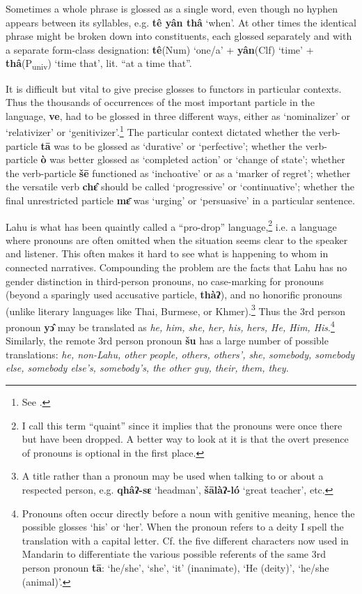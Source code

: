 Sometimes a whole phrase is glossed as a single word, even though no
hyphen appears between its syllables, e.g. \textbf{tê yân thâ} `when'.
At other times the identical phrase might be broken down into
constituents, each glossed separately and with a separate form-class
designation: \textbf{tê}(Num) `one/a' + \textbf{yân}(Clf) `time' +
\textbf{thâ}(P\textsubscript{univ}) `time that', lit. ``at a time that''.

It is difficult but vital to give precise glosses to functors in
particular contexts. Thus the thousands of occurrences of the most
important particle in the language, \textbf{ve}, had to be glossed in
three different ways, either as `nominalizer' or `relativizer' or
`genitivizer'.\footnote{See \citet{matisoff1972}.} The particular context
dictated whether the verb-particle \textbf{tā} was to be glossed as
`durative' or `perfective'; whether the verb-particle \textbf{ò} was
better glossed as `completed action' or `change of state'; whether the
verb-particle \textbf{šē} functioned as `inchoative' or as a `marker of
regret'; whether the versatile verb \textbf{chɛ̂} should be called
`progressive' or `continuative'; whether the final unrestricted particle
\textbf{mɛ̄} was `urging' or `persuasive' in a particular sentence.

Lahu is what has been quaintly called a ``pro-drop''
language,\footnote{I call this term ``quaint'' since it implies that
  the pronouns were once there but have been dropped. A better way to
  look at it is that the overt presence of pronouns is optional in the
  first place.} i.e. a language where pronouns are often omitted when
the situation seems clear to the speaker and listener. This often
makes it hard to see what is happening to whom in connected
narratives. Compounding the problem are the facts that Lahu has no
gender distinction in third-person pronouns, no case-marking for
pronouns (beyond a sparingly used accusative particle, \textbf{thàʔ}),
and no honorific pronouns (unlike literary languages like Thai,
Burmese, or Khmer).\footnote{A title rather than a pronoun may be used
  when talking to or about a respected person, e.g. \textbf{qhâʔ-sɛ}
  `headman', \textbf{šālàʔ-ló} `great teacher', etc. } Thus the 3rd
person pronoun \textbf{yɔ̂ }may be translated as \emph{he, him, she,
  her, his, hers, He, Him, His}.\footnote{Pronouns often occur
  directly before a noun with genitive meaning, hence the possible
  glosses `his' or `her'.  When the pronoun refers to a deity I spell
  the translation with a capital letter. Cf. the five different
  characters now used in Mandarin to differentiate the various
  possible referents of the same 3rd person pronoun
  \textbf{tā}:  `he/she',  `she',  `it' (inanimate),  `He
  (deity)',  `he/she (animal)'.} Similarly, the remote 3rd person
pronoun \textbf{šu} has a large number of possible
translations: \emph{he, non-Lahu, other people,
others, others', she, somebody, somebody else, somebody else's,
somebody's, the other guy, their, them, they}.

